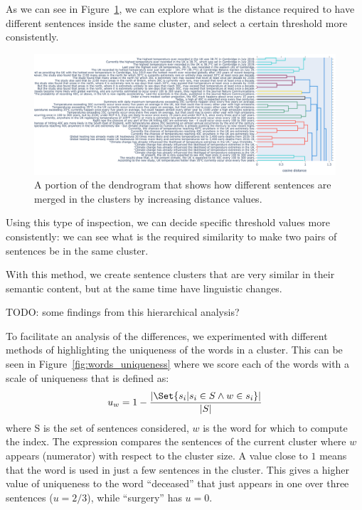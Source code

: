 As we can see in Figure~\ref{fig:dendrogram}, we can explore what is the distance required to have different sentences inside the same cluster, and select a certain threshold more consistently.
\begin{figure}[!htb]
    \centering
    \includegraphics[width=\linewidth]{figures/dendrogram.png}
    \caption{A portion of the dendrogram that shows how different sentences are merged in the clusters by increasing distance values.}
    \label{fig:dendrogram}
\end{figure}

Using this type of inspection, we can decide specific threshold values more consistently: we can see what is the required similarity to make two pairs of sentences be in the same cluster.

With this method, we create sentence clusters that are very similar in their semantic content, but at the same time have linguistic changes.

TODO: some findings from this hierarchical analysis?

To facilitate an analysis of the differences, we experimented with different methods of highlighting the uniqueness of the words in a cluster.
This can be seen in Figure~\ref{fig:words_uniqueness} where we score each of the words with a scale of uniqueness that is defined as:
$$u_w = 1 - \frac{|\Set{s_i | s_i \in S \land w \in s_i}|}{|S|}$$
where S is the set of sentences considered, $w$ is the word for which to compute the index. The expression compares the sentences of the current cluster where $w$ appears (numerator) with respect to the cluster size.
A value close to $1$ means that the word is used in just a few sentences in the cluster.
This gives a higher value of uniqueness to the word ``deceased'' that just appears in one over three sentences ($u = 2/3$), while ``surgery'' has $u = 0$.


